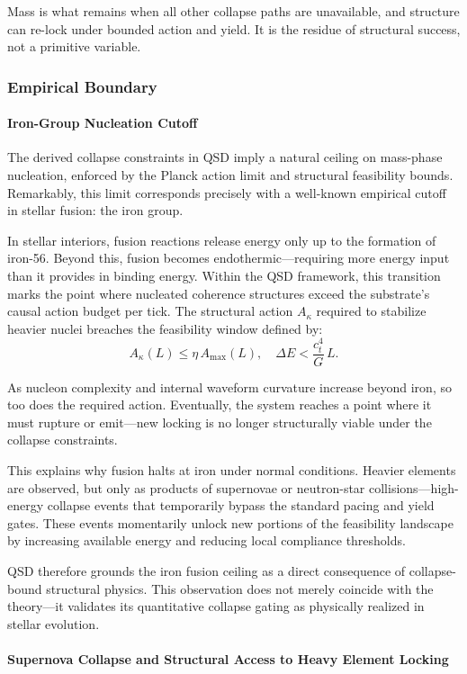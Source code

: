 \documentclass[preprints,article,submit,pdftex,moreauthors]{Definitions/mdpi}
\begin{document}
Mass is what remains when all other collapse paths are unavailable, and structure can re-lock under bounded action and yield. It is the residue of structural success, not a primitive variable.

\subsubsection{Empirical Boundary}
\paragraph{Iron-Group Nucleation Cutoff}

The derived collapse constraints in QSD imply a natural ceiling on mass-phase nucleation, enforced by the Planck action limit and structural feasibility bounds. Remarkably, this limit corresponds precisely with a well-known empirical cutoff in stellar fusion: the iron group.

In stellar interiors, fusion reactions release energy only up to the formation of iron-56. Beyond this, fusion becomes endothermic—requiring more energy input than it provides in binding energy. Within the QSD framework, this transition marks the point where nucleated coherence structures exceed the substrate’s causal action budget per tick. The structural action \( A_\kappa \) required to stabilize heavier nuclei breaches the feasibility window defined by:
\[
A_\kappa(L) \leq \eta\,A_{\max}(L), \quad \Delta E < \frac{c_t^4}{G}\,L.
\]

As nucleon complexity and internal waveform curvature increase beyond iron, so too does the required action. Eventually, the system reaches a point where it must rupture or emit—new locking is no longer structurally viable under the collapse constraints.

This explains why fusion halts at iron under normal conditions. Heavier elements are observed, but only as products of supernovae or neutron-star collisions—high-energy collapse events that temporarily bypass the standard pacing and yield gates. These events momentarily unlock new portions of the feasibility landscape by increasing available energy and reducing local compliance thresholds.

QSD therefore grounds the iron fusion ceiling as a direct consequence of collapse-bound structural physics. This observation does not merely coincide with the theory—it validates its quantitative collapse gating as physically realized in stellar evolution.

\paragraph{Supernova Collapse and Structural Access to Heavy Element Locking}
\end{document}
